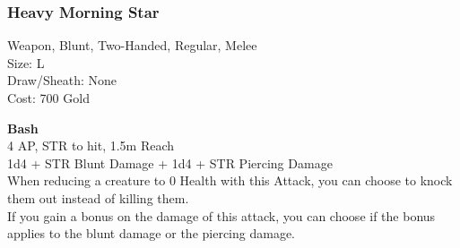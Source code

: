 \subsubsection{Heavy Morning Star}\label{weapon:heavyMorningStar}
Weapon, Blunt, Two-Handed, Regular, Melee\\
Size: L\\
Draw/Sheath: None\\
Cost: 700 Gold

\textbf{Bash}\\
4 AP, STR to hit, 1.5m Reach\\
1d4 + \texttimes STR Blunt Damage + 1d4 + \texttimes STR Piercing Damage\\
When reducing a creature to 0 Health with this Attack, you can choose to knock them out instead of killing them.\\
If you gain a bonus on the damage of this attack, you can choose if the bonus applies to the blunt damage or the piercing damage.